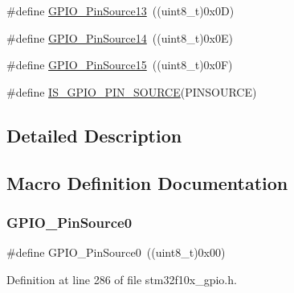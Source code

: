 \begin{DoxyCompactItemize}
\item 
\#define \hyperlink{group___g_p_i_o___pin__sources_gace4beb385facd306324fa9e362df5fda}{G\+P\+I\+O\+\_\+\+Pin\+Source13}~((uint8\+\_\+t)0x0\+D)
\item 
\#define \hyperlink{group___g_p_i_o___pin__sources_ga5fbb540a86af4015a46ac16c61ddb1f7}{G\+P\+I\+O\+\_\+\+Pin\+Source14}~((uint8\+\_\+t)0x0\+E)
\item 
\#define \hyperlink{group___g_p_i_o___pin__sources_ga9b29d9a9ecb1579ecedf4ea53ccbfd5b}{G\+P\+I\+O\+\_\+\+Pin\+Source15}~((uint8\+\_\+t)0x0\+F)
\item 
\#define \hyperlink{group___g_p_i_o___pin__sources_ga689e4e72591136b6a8d4df9d895181f7}{I\+S\+\_\+\+G\+P\+I\+O\+\_\+\+P\+I\+N\+\_\+\+S\+O\+U\+R\+CE}(P\+I\+N\+S\+O\+U\+R\+CE)
\end{DoxyCompactItemize}


\subsection{Detailed Description}


\subsection{Macro Definition Documentation}
\mbox{\label{group___g_p_i_o___pin__sources_ga028bcbdf5a7fd81ec45830f60a022bb4}} 
\subsubsection{\texorpdfstring{G\+P\+I\+O\+\_\+\+Pin\+Source0}{GPIO\_PinSource0}}
{\footnotesize\ttfamily \#define G\+P\+I\+O\+\_\+\+Pin\+Source0~((uint8\+\_\+t)0x00)}



Definition at line 286 of file stm32f10x\+\_\+gpio.\+h.

\mbox{\label{group___g_p_i_o___pin__sources_gad02324cdd8526a7aacd15a5a910d56f1}} 
